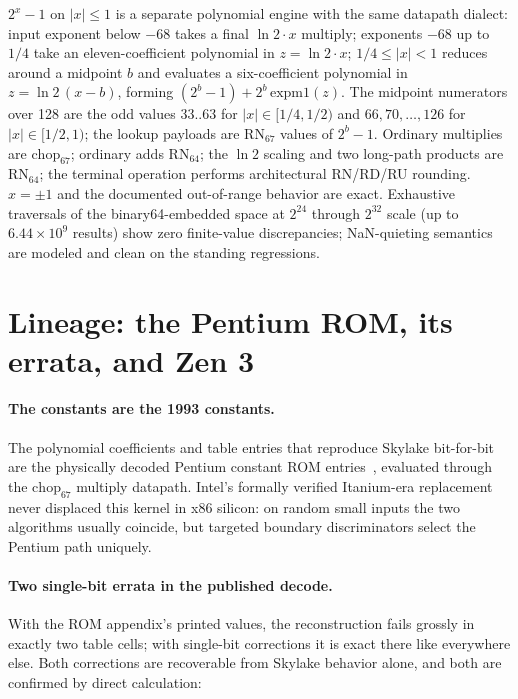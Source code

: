 \documentclass[11pt]{article}
\newcommand{\chop}[1]{\mathrm{chop}_{#1}}   %
\newcommand{\rn}[1]{\mathrm{RN}_{#1}}       %
\begin{document}
$2^x - 1$ on $|x| \le 1$ is a separate polynomial engine with the
same datapath dialect: input exponent below $-68$ takes a final
$\ln 2 \cdot x$ multiply; exponents $-68$ up to $1/4$ take an
eleven-coefficient polynomial in $z = \ln 2 \cdot x$; $1/4 \le |x| <
1$ reduces around a midpoint $b$ and evaluates a six-coefficient
polynomial in $z = \ln 2\,(x - b)$, forming $(2^b - 1) + 2^b\,
\mathrm{expm1}(z)$.  The midpoint numerators over 128 are the odd
values $33..63$ for $|x| \in [1/4, 1/2)$ and $66, 70, \ldots, 126$
for $|x| \in [1/2, 1)$; the lookup payloads are $\rn{67}$ values of
$2^b - 1$.  Ordinary multiplies are $\chop{67}$; ordinary adds
$\rn{64}$; the $\ln 2$ scaling and two long-path products are
$\rn{64}$; the terminal operation performs architectural RN/RD/RU
rounding.  $x = \pm 1$ and the documented out-of-range behavior are
exact.  Exhaustive traversals of the binary64-embedded space at
$2^{24}$ through $2^{32}$ scale (up to $6.44\times10^{9}$ results)
show zero finite-value discrepancies; NaN-quieting semantics are
modeled and clean on the standing regressions.

\section{Lineage: the Pentium ROM, its errata, and Zen 3}
\label{sec:lineage}

\paragraph{The constants are the 1993 constants.}  The polynomial
coefficients and table entries that reproduce Skylake bit-for-bit are
the physically decoded Pentium constant ROM entries~\cite{shirriff2025},
evaluated through the $\chop{67}$ multiply datapath.  Intel's
formally verified Itanium-era replacement~\cite{harrison2000} never
displaced this kernel in x86 silicon: on random small inputs the two
algorithms usually coincide, but targeted boundary discriminators
select the Pentium path uniquely.

\paragraph{Two single-bit errata in the published decode.}  With the
ROM appendix's printed values, the reconstruction fails grossly in
exactly two table cells; with single-bit corrections it is exact
there like everywhere else.  Both corrections are recoverable from
Skylake behavior alone, and both are confirmed by direct calculation:
\end{document}
